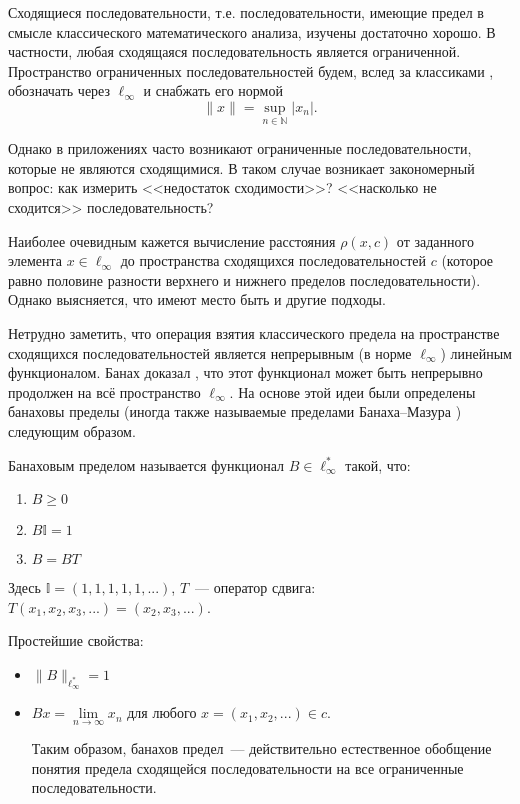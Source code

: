 Сходящиеся последовательности, т.е. последовательности, имеющие предел в смысле классического математического анализа,
изучены достаточно хорошо.
В частности, любая сходящаяся последовательность является ограниченной.
Пространство ограниченных последовательностей будем, вслед за классиками \cite{wojtaszczyk1996banach,lindenstrauss1973classical},
обозначать через $\ell_\infty$ и снабжать его нормой
\begin{equation*}
	\|x\| = \sup_{n\in\mathbb{N}}|x_n|
	.
\end{equation*}

Однако в приложениях часто возникают ограниченные последовательности,
которые не являются сходящимися.
В таком случае возникает закономерный вопрос:
как измерить <<недостаток сходимости>>?
<<насколько не сходится>> последовательность?

Наиболее очевидным кажется вычисление расстояния $\rho(x,c)$ от заданного элемента $x\in\ell_\infty$
до пространства сходящихся последовательностей $c$
(которое равно половине разности верхнего и нижнего пределов последовательности).
Однако выясняется, что имеют место быть и другие подходы.

Нетрудно заметить, что операция взятия классического предела на пространстве сходящихся последовательностей
является непрерывным (в норме $\ell_\infty$) линейным функционалом.
Банах доказал \cite{banach1993theorie}, что этот функционал может быть непрерывно продолжен на всё пространство $\ell_\infty$.
На основе этой идеи были определены банаховы пределы
(иногда также называемые пределами Банаха--Мазура \cite{alekhno2012superposition,alekhno2015banach})
следующим образом.

Банаховым пределом называется функционал $B\in \ell_\infty^*$ такой, что:
\begin{enumerate}
	\item
		$B \geqslant 0$
	\item
		$B\mathbb{I} = 1$
	\item
		$B=BT$
\end{enumerate}
Здесь $\mathbb{I}=(1,1,1,1,1,...)$,
$T$~--- оператор сдвига: $T(x_1, x_2, x_3, ...) = (x_2, x_3, ...)$.

Простейшие свойства:
\begin{itemize}
	\item
		$\|B\|_{\ell_\infty^*} = 1$
	\item
		$Bx = \lim\limits_{n\to\infty} x_n$ для любого $x=(x_1, x_2, ...) \in c$.

		Таким образом,
		банахов предел~--- действительно естественное обобщение понятия предела сходящейся последовательности
		на все ограниченные последовательности.
\end{itemize}

